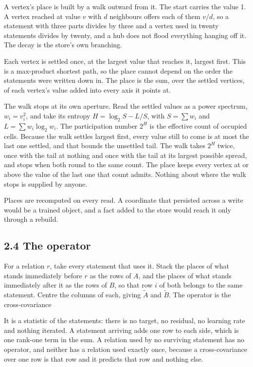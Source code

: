 \documentclass[10pt,letterpaper,twocolumn]{article}
\begin{document}
A vertex's place is built by a walk outward from it. The start carries the value 1. A vertex reached
at value \(v\) with \(d\) neighbours offers each of them \(v / d\), so a statement with three parts divides
by three and a vertex used in twenty statements divides by twenty, and a hub does not flood
everything hanging off it. The decay is the store's own branching.

Each vertex is settled once, at the largest value that reaches it, largest first. This is a
max-product shortest path, so the place cannot depend on the order the statements were written down
in. The place is the sum, over the settled vertices, of each vertex's value added into every axis it
points at.

The walk stops at its own aperture. Read the settled values as a power spectrum,
\(w_i = v_i^2\), and take its entropy \(H = \log_2 S - L / S\), with \(S = \sum w_i\) and
\(L = \sum w_i \log_2 w_i\). The participation number \(2^H\) is the effective count of occupied cells.
Because the walk settles largest first, every value still to come is at most the last one settled,
and that bounds the unsettled tail. The walk takes \(2^H\) twice, once with the tail at nothing and
once with the tail at its largest possible spread, and stops when both round to the same count. The
place keeps every vertex at or above the value of the last one that count admits. Nothing about where
the walk stops is supplied by anyone.

Places are recomputed on every read. A coordinate that persisted across a write would be a trained
object, and a fact added to the store would reach it only through a rebuild.

\subsection{2.4 The operator}\label{24-the-operator}

For a relation \(r\), take every statement that uses it. Stack the places of what stands immediately
before \(r\) as the rows of \(A\), and the places of what stands immediately after it as the rows of
\(B\), so that row \(i\) of both belongs to the same statement. Centre the columns of each, giving
\(\tilde{A}\) and \(\tilde{B}\). The operator is the cross-covariance


It is a statistic of the statements: there is no target, no residual, no learning rate and nothing
iterated. A statement arriving adds one row to each side, which is one rank-one term in the sum.
A relation used by no surviving statement has no operator, and neither has a relation used exactly
once, because a cross-covariance over one row is that row and it predicts that row and nothing else.
\end{document}
